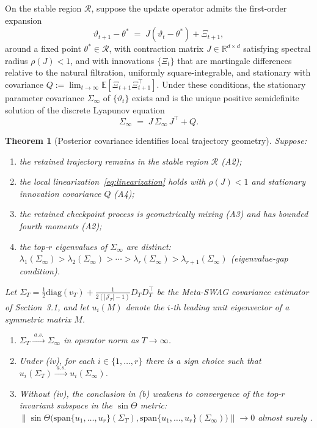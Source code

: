 \documentclass[10pt]{article}
\theoremstyle{plain}
\newtheorem{theorem}{Theorem}
\theoremstyle{definition}
\theoremstyle{remark}
\newcommand{\E}{\mathbb{E}}
\newcommand{\diag}{\mathrm{diag}}
\begin{document}
On the stable region $\mathcal{R}$, suppose the update operator admits the first-order expansion
\begin{equation}\label{eq:linearization}
\vartheta_{t+1} - \theta^\ast \;=\; J(\vartheta_t - \theta^\ast) + \Xi_{t+1},
\end{equation}
around a fixed point $\theta^\ast\in\mathcal{R}$, with contraction matrix $J\in\mathbb{R}^{d\times d}$ satisfying spectral radius $\rho(J)<1$, and with innovations $\{\Xi_t\}$ that are martingale differences relative to the natural filtration, uniformly square-integrable, and stationary with covariance $Q := \lim_{t\to\infty}\E[\Xi_{t+1}\Xi_{t+1}^\top]$. Under these conditions, the stationary parameter covariance $\Sigma_\infty$ of $\{\vartheta_t\}$ exists and is the unique positive semidefinite solution of the discrete Lyapunov equation
\begin{equation}\label{eq:lyap}
\Sigma_\infty \;=\; J\,\Sigma_\infty\,J^\top + Q.
\end{equation}

\begin{theorem}[Posterior covariance identifies local trajectory geometry]\label{thm:geom}
Suppose:
\begin{enumerate}[leftmargin=1.8em,itemsep=0.2em,label=\textup{(\roman*)}]
  \item the retained trajectory remains in the stable region $\mathcal{R}$ (A2);
  \item the local linearization~\eqref{eq:linearization} holds with $\rho(J)<1$ and stationary innovation covariance $Q$ (A4);
  \item the retained checkpoint process is geometrically mixing (A3) and has bounded fourth moments (A2);
  \item the top-$r$ eigenvalues of $\Sigma_\infty$ are distinct:
  $\lambda_1(\Sigma_\infty) > \lambda_2(\Sigma_\infty) > \cdots > \lambda_r(\Sigma_\infty) > \lambda_{r+1}(\Sigma_\infty)$ \textup{(eigenvalue-gap condition).}
\end{enumerate}
Let $\Sigma_T = \tfrac{1}{2}\diag(v_T) + \tfrac{1}{2(|\mathcal{J}_T|-1)}D_T D_T^\top$ be the Meta-SWAG covariance estimator of Section~3.1, and let $u_i(M)$ denote the $i$-th leading unit eigenvector of a symmetric matrix $M$.
\begin{enumerate}[leftmargin=1.8em,itemsep=0.2em,label=\textup{(\alph*)}]
  \item $\Sigma_T \xrightarrow{\;a.s.\;} \Sigma_\infty$ in operator norm as $T\to\infty$.
  \item Under \textup{(iv)}, for each $i\in\{1,\dots,r\}$ there is a sign choice such that $u_i(\Sigma_T) \xrightarrow{\;a.s.\;} u_i(\Sigma_\infty)$.
  \item Without \textup{(iv)}, the conclusion in \textup{(b)} weakens to convergence of the top-$r$ invariant subspace in the $\sin\Theta$ metric: $\|\sin\Theta\bigl(\mathrm{span}\{u_1,\dots,u_r\}(\Sigma_T),\mathrm{span}\{u_1,\dots,u_r\}(\Sigma_\infty)\bigr)\|\to 0$ almost surely \textup{\citep{DavisKahan1970}}.
\end{enumerate}
\end{theorem}
\end{document}
